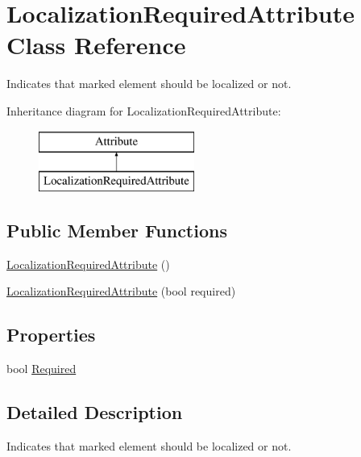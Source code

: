 \hypertarget{class_localization_required_attribute}{}\section{Localization\+Required\+Attribute Class Reference}
\label{class_localization_required_attribute}


Indicates that marked element should be localized or not.  


Inheritance diagram for Localization\+Required\+Attribute\+:\begin{figure}[H]
\begin{center}
\leavevmode
\includegraphics[height=2.000000cm]{class_localization_required_attribute}
\end{center}
\end{figure}
\subsection*{Public Member Functions}
\begin{DoxyCompactItemize}
\item 
\hyperlink{class_localization_required_attribute_aa2b3c3c66137921e96fd08310066c914}{Localization\+Required\+Attribute} ()
\item 
\hyperlink{class_localization_required_attribute_a7d6235d2f8883d6f6311ca2a95156a9c}{Localization\+Required\+Attribute} (bool required)
\end{DoxyCompactItemize}
\subsection*{Properties}
\begin{DoxyCompactItemize}
\item 
bool \hyperlink{class_localization_required_attribute_af8b46c34356964b9b15c22c7e5113d23}{Required}
\end{DoxyCompactItemize}


\subsection{Detailed Description}
Indicates that marked element should be localized or not. 


